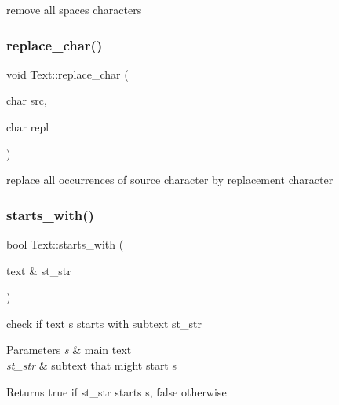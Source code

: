 remove all spaces characters \mbox{\label{classez_1_1objects_1_1Text_a282fb4b0d7acbcc2f7d00eea501fc43f}} 
\subsubsection{\texorpdfstring{replace\+\_\+char()}{replace\_char()}}
{\footnotesize\ttfamily void Text\+::replace\+\_\+char (\begin{DoxyParamCaption}\item[{char}]{src,  }\item[{char}]{repl }\end{DoxyParamCaption})}

replace all occurrences of source character by replacement character \mbox{\label{classez_1_1objects_1_1Text_a030ba4985d1a369418ca3167ac01fcd7}} 
\subsubsection{\texorpdfstring{starts\+\_\+with()}{starts\_with()}}
{\footnotesize\ttfamily bool Text\+::starts\+\_\+with (\begin{DoxyParamCaption}\item[{text \&}]{st\+\_\+str }\end{DoxyParamCaption})}

check if text s starts with subtext st\+\_\+str 
\begin{DoxyParams}{Parameters}
{\em s} & main text \\
\hline
{\em st\+\_\+str} & subtext that might start s \\
\hline
\end{DoxyParams}
\begin{DoxyReturn}{Returns}
true if st\+\_\+str starts s, false otherwise 
\end{DoxyReturn}
\mbox{\label{classez_1_1objects_1_1Text_a9462f3c187757fb60a496976ecd0fc16}} 
